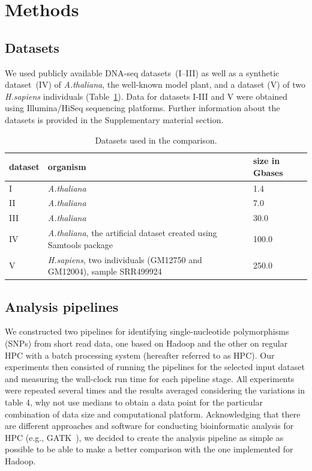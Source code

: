\documentclass[11pt, oneside]{article}   	%
\newcommand{\COMMENT}[1]{{\color{red} #1 }}
\begin{document}
\section{Methods}
\label{sectionII}

\subsection{Datasets}
We used publicly available DNA-seq datasets~(I--III) as well as a synthetic dataset~(IV) of {\it A.thaliana}, the well-known model plant, and a dataset (V) of two {\it H.sapiens} individuals (Table~\ref{table:datasets}). Data for datasets I-III and V were obtained using Illumina/HiSeq sequencing platforms. Further information about the datasets is provided in the Supplementary material section.


\begin{table}[htdp]
\small
\footnotesize
\caption{Datasets used in the comparison. }
\begin{center}
\begin{tabular}{|l|l|l|}
dataset &	organism &	size in Gbases\\
\hline
 I		&	{\it A.thaliana}	&	1.4	\\
 II	&	{\it A.thaliana}	&	7.0\\
  III	&	{\it A.thaliana}	&	30.0	\\
 IV	&{\it A.thaliana}, the artificial dataset created using Samtools package	&	100.0	\\
 V	&	{\it H.sapiens}, two individuals (GM12750 and GM12004), sample SRR499924		&	250.0\\

\end{tabular}
\end{center}
\label{table:datasets}
\normalsize
\end{table}%


\subsection{Analysis pipelines}
We constructed two pipelines for identifying single-nucleotide polymorphisms (SNPs) from short read data, one based on Hadoop and the other on regular HPC with a batch processing system (hereafter referred to as HPC). Our experiments then consisted of running the pipelines for the selected input dataset and measuring the wall-clock run time for each pipeline stage. All experiments were repeated several times and the results averaged \COMMENT{considering the variations in table 4, why not use medians} to obtain a data point for the particular combination of data size and computational platform. Acknowledging that there are different approaches and software for conducting bioinformatic analysis for HPC (e.g., GATK~\cite{gatk}), we decided to create the analysis pipeline as simple as possible to be able to make a better comparison with the one implemented for Hadoop.
\end{document}
